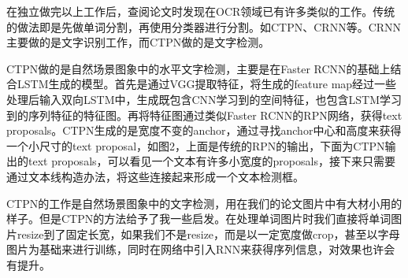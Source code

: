 \documentclass[12pt]{article}
\begin{document}
在独立做完以上工作后，查阅论文时发现在OCR领域已有许多类似的工作。传统的做法即是先做单词分割，再使用分类器进行分割。如CTPN\cite{ctpn}、CRNN等。CRNN主要做的是文字识别工作，而CTPN做的是文字检测。

CTPN做的是自然场景图象中的水平文字检测，主要是在Faster RCNN的基础上结合LSTM生成的模型。首先是通过VGG提取特征，将生成的feature map经过一些处理后输入双向LSTM中，生成既包含CNN学习到的空间特征，也包含LSTM学习到的序列特征的特征图。再将特征图通过类似Faster RCNN的RPN网络，获得text proposals。CTPN生成的是宽度不变的anchor，通过寻找anchor中心和高度来获得一个小尺寸的text proposal，如图2，上面是传统的RPN的输出，下面为CTPN输出的text proposals，可以看见一个文本有许多小宽度的proposals，接下来只需要通过文本线构造办法，将这些连接起来形成一个文本检测框。

CTPN的工作是自然场景图象中的文字检测，用在我们的论文图片中有大材小用的样子。但是CTPN的方法给予了我一些启发。在处理单词图片时我们直接将单词图片resize到了固定长宽，如果我们不是resize，而是以一定宽度做crop，甚至以字母图片为基础来进行训练，同时在网络中引入RNN来获得序列信息，对效果也许会有提升。

\newpage

\end{document}
